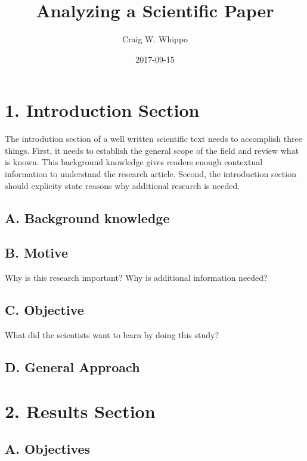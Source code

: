 \documentclass[]{tufte-handout}
\title{Analyzing a Scientific Paper}
\author{Craig W. Whippo}
\date{2017-09-15}
\begin{document}
\maketitle




\section{1. Introduction Section}\label{introduction-section}

The introdution section of a well written scientific text needs to
accomplish three things. First, it needs to establish the general scope
of the field and review what is known. This background knowledge gives
readers enough contextual information to understand the research
article. Second, the introduction section should explicity state reasons
why additional research is needed.

\subsection{A. Background knowledge}\label{a.-background-knowledge}

\subsection{B. Motive}\label{b.-motive}

Why is this research important? Why is additional information needed?

\subsection{C. Objective}\label{c.-objective}

What did the scientists want to learn by doing this study?

\subsection{D. General Approach}\label{d.-general-approach}

\section{2. Results Section}\label{results-section}

\subsection{A. Objectives}\label{a.-objectives}
\end{document}
